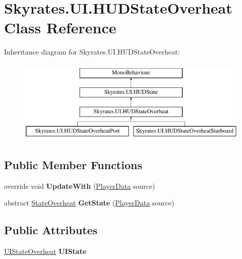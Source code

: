 \hypertarget{class_skyrates_1_1_u_i_1_1_h_u_d_state_overheat}{\section{Skyrates.\-U\-I.\-H\-U\-D\-State\-Overheat Class Reference}
\label{class_skyrates_1_1_u_i_1_1_h_u_d_state_overheat}
}
Inheritance diagram for Skyrates.\-U\-I.\-H\-U\-D\-State\-Overheat\-:\begin{figure}[H]
\begin{center}
\leavevmode
\includegraphics[height=4.000000cm]{class_skyrates_1_1_u_i_1_1_h_u_d_state_overheat}
\end{center}
\end{figure}
\subsection*{Public Member Functions}
\begin{DoxyCompactItemize}
\item 
\hypertarget{class_skyrates_1_1_u_i_1_1_h_u_d_state_overheat_ad3286670ec9b8f4b0fdd40d961070c8b}{override void {\bfseries Update\-With} (\hyperlink{class_skyrates_1_1_data_1_1_player_data}{Player\-Data} source)}\label{class_skyrates_1_1_u_i_1_1_h_u_d_state_overheat_ad3286670ec9b8f4b0fdd40d961070c8b}

\item 
\hypertarget{class_skyrates_1_1_u_i_1_1_h_u_d_state_overheat_a8779b3dd80f463d93a84e2ecd2cc62e0}{abstract \hyperlink{class_skyrates_1_1_misc_1_1_state_overheat}{State\-Overheat} {\bfseries Get\-State} (\hyperlink{class_skyrates_1_1_data_1_1_player_data}{Player\-Data} source)}\label{class_skyrates_1_1_u_i_1_1_h_u_d_state_overheat_a8779b3dd80f463d93a84e2ecd2cc62e0}

\end{DoxyCompactItemize}
\subsection*{Public Attributes}
\begin{DoxyCompactItemize}
\item 
\hypertarget{class_skyrates_1_1_u_i_1_1_h_u_d_state_overheat_a8f5bdcf2a603989d07be9756efa4d5be}{\hyperlink{class_u_i_state_overheat}{U\-I\-State\-Overheat} {\bfseries U\-I\-State}}\label{class_skyrates_1_1_u_i_1_1_h_u_d_state_overheat_a8f5bdcf2a603989d07be9756efa4d5be}

\end{DoxyCompactItemize}
